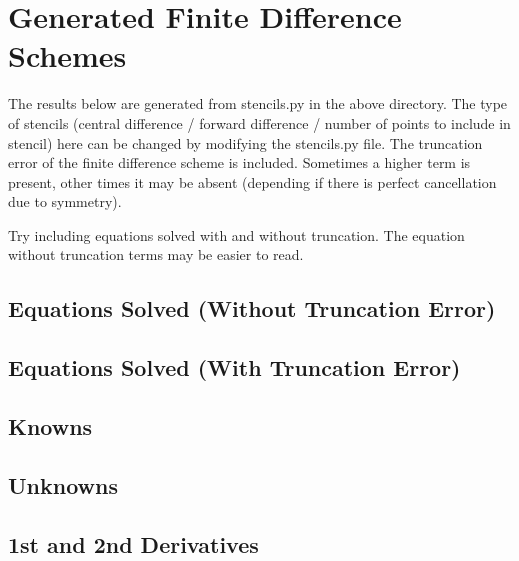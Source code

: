 \documentclass[landscape]{article}
\begin{document}
\section{Generated Finite Difference Schemes}
The results below are generated from stencils.py in the above directory. The type of stencils (central difference / forward difference / number of points to include in stencil) here can be changed by modifying the stencils.py file. The truncation error of the finite difference scheme is included. Sometimes a higher term is present, other times it may be absent (depending if there is perfect cancellation due to symmetry).

Try including equations solved with and without truncation. The equation without truncation terms may be easier to read.

\subsection{Equations Solved (Without Truncation Error)}

\subsection{Equations Solved (With Truncation Error)}

\subsection{Knowns}

\subsection{Unknowns}



% 
% 
% 
% 

\subsection{1st and 2nd Derivatives}


% 


% 
\end{document}
